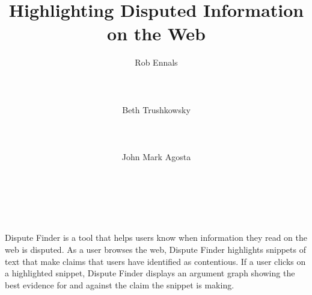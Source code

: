\documentclass{www2010-submission}
\begin{document}
\toappear



\title{Highlighting Disputed Information on the Web}



\author{
\alignauthor Rob Ennals\\
       \\
       \\
       \\
\alignauthor Beth Trushkowsky\\
       \\
       \\
       \\
\alignauthor John Mark Agosta\\
       \\
       \\
       \\
}



\maketitle



\abstract
Dispute Finder is a tool that helps users know when information they read on the web is disputed. 
As a user browses the web, Dispute Finder highlights snippets of text that make claims that users have identified as contentious. 
If a user clicks on a highlighted snippet, Dispute Finder displays an argument graph showing the best evidence for and against the claim the snippet is making.
\end{document}
